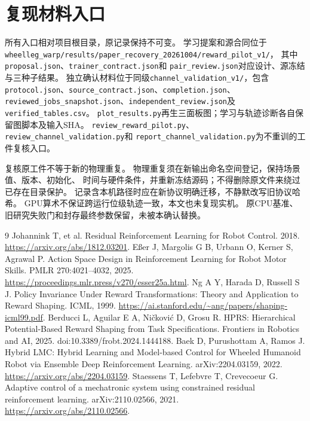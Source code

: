 \documentclass[UTF8,a4paper,11pt]{ctexart}
\begin{document}
\section{复现材料入口}
所有入口相对项目根目录，原记录保持不可变。
学习提案和源合同位于
\texttt{wheelleg\_warp/results/paper\_recovery\_20261004/reward\_pilot\_v1/}，
其中\texttt{proposal.json}、\texttt{trainer\_contract.json}和
\texttt{pair\_review.json}对应设计、源冻结与三种子结果。
独立确认材料位于同级\texttt{channel\_validation\_v1/}，包含
\texttt{protocol.json}、\texttt{source\_contract.json}、\texttt{completion.json}、
\texttt{reviewed\_jobs\_snapshot.json}、\texttt{independent\_review.json}及
\texttt{verified\_tables.csv}。
\texttt{plot\_results.py}再生三面板图；学习与轨迹诊断各自保留图脚本及输入SHA。
\texttt{review\_reward\_pilot.py}、\texttt{review\_channel\_validation.py}和
\texttt{report\_channel\_validation.py}为不重训的工件复核入口。

复核原工件不等于新的物理重复。
物理重复须在新输出命名空间登记，保持场景值、版本、初始化、
时间与硬件条件，并重新冻结源码；不得删除原文件来绕过已存在目录保护。
记录含本机路径时应在新协议明确迁移，不静默改写旧协议哈希。
GPU算术不保证跨运行位级轨迹一致，本文也未复现实机。
原CPU基准、旧研究失败门和封存最终参数保留，未被本确认替换。

\begin{thebibliography}{9}
 Johannink T, et al. Residual Reinforcement Learning for Robot Control. 2018.
\url{https://arxiv.org/abs/1812.03201}.
 E\ss{}er J, Margolis G B, Urbann O, Kerner S, Agrawal P.
Action Space Design in Reinforcement Learning for Robot Motor Skills.
PMLR 270:4021--4032, 2025. \url{https://proceedings.mlr.press/v270/esser25a.html}.
 Ng A Y, Harada D, Russell S J. Policy Invariance Under Reward Transformations:
Theory and Application to Reward Shaping. ICML, 1999.
\url{https://ai.stanford.edu/~ang/papers/shaping-icml99.pdf}.
 Berducci L, Aguilar E A, Ničković D, Grosu R.
HPRS: Hierarchical Potential-Based Reward Shaping from Task Specifications.
Frontiers in Robotics and AI, 2025. doi:10.3389/frobt.2024.1444188.
 Baek D, Purushottam A, Ramos J.
Hybrid LMC: Hybrid Learning and Model-based Control for Wheeled Humanoid Robot via Ensemble Deep Reinforcement Learning.
arXiv:2204.03159, 2022. \url{https://arxiv.org/abs/2204.03159}.
 Staessens T, Lefebvre T, Crevecoeur G.
Adaptive control of a mechatronic system using constrained residual reinforcement learning.
arXiv:2110.02566, 2021. \url{https://arxiv.org/abs/2110.02566}.
\end{thebibliography}
\end{document}
